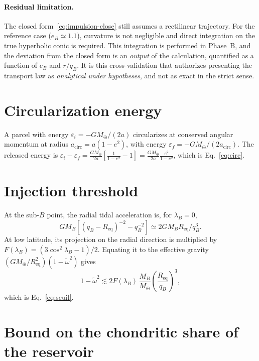 \documentclass[11pt,a4paper,openany]{report}
\newcommand{\Mt}{M_{\oplus}}
\newcommand{\Req}{R_{\mathrm{eq}}}
\begin{document}
\paragraph{Residual limitation.}
The closed form~\eqref{eq:impulsion-close} still assumes a rectilinear trajectory. For the reference
case ($e_B\simeq1.1$), curvature is not negligible and direct integration on the true hyperbolic
conic is required. This integration is performed in Phase~B, and the deviation from the closed form
is an \emph{output} of the calculation, quantified as a function of $e_B$ and $r/q_B$. It is this
cross-validation that authorizes presenting the transport law as \emph{analytical under hypotheses},
and not as exact in the strict sense.

\section{Circularization energy}

A parcel with energy $\varepsilon_i=-G\Mt/(2a)$ circularizes at conserved angular momentum at radius
$a_{\mathrm{circ}}=a(1-e^2)$, with energy $\varepsilon_f=-G\Mt/(2a_{\mathrm{circ}})$. The released
energy is
$\varepsilon_i-\varepsilon_f=\frac{G\Mt}{2a}\left[\frac{1}{1-e^2}-1\right]=\frac{G\Mt}{2a}\frac{e^2}{1-e^2}$,
which is Eq.~\eqref{eq:circ}.

\section{Injection threshold}

At the sub-$B$ point, the radial tidal acceleration is, for $\lambda_B=0$,
\begin{equation}
GM_B\left[(q_B-\Req)^{-2}-q_B^{-2}\right]\simeq2GM_B\Req/q_B^3.
\end{equation}
At low latitude, its projection on the radial direction is multiplied by
$F(\lambda_B)=(3\cos^2\lambda_B-1)/2$. Equating it to the effective gravity
$(G\Mt/\Req^2)(1-\tilde\omega^2)$ gives
\begin{equation}
1-\tilde\omega^2\lesssim2F(\lambda_B)\,\frac{M_B}{\Mt}\left(\frac{\Req}{q_B}\right)^3,
\end{equation}
which is Eq.~\eqref{eq:seuil}.

\section{Bound on the chondritic share of the reservoir}
\label{app:borneW}
\end{document}
